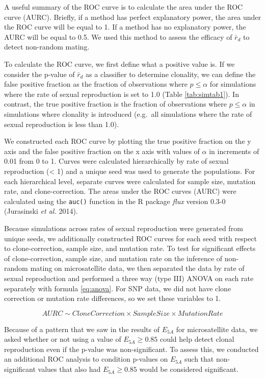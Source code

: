 \documentclass[]{article}
\theoremstyle{definition}
\theoremstyle{definition}
\theoremstyle{remark}
\begin{document}
A useful summary of the ROC curve is to calculate the area under the ROC
curve (AURC). Briefly, if a method has perfect explanatory power, the
area under the ROC curve will be equal to 1. If a method has no
explanatory power, the AURC will be equal to 0.5. We used this method to
assess the efficacy of \(\bar{r}_d\) to detect non-random mating.

To calculate the ROC curve, we first define what a positive value is. If
we consider the p-value of \(\bar{r}_d\) as a classifier to determine
clonality, we can define the false positive fraction as the fraction of
observations where \(p \leq \alpha\) for simulations where the rate of
sexual reproduction is set to 1.0 (Table \ref{tab:simtab1}). In
contrast, the true positive fraction is the fraction of observations
where \(p \leq \alpha\) in simulations where clonality is introduced
(e.g.~all simulations where the rate of sexual reproduction is less than
1.0).

We constructed each ROC curve by plotting the true positive fraction on
the y axis and the false positive fraction on the x axis with values of
\(\alpha\) in increments of 0.01 from 0 to 1. Curves were calculated
hierarchically by rate of sexual reproduction (\textless{} 1) and a
unique seed was used to generate the populations. For each hierarchical
level, separate curves were calculated for sample size, mutation rate,
and clone-correction. The areas under the ROC curves (AURC) were
calculated using the \texttt{auc()} function in the R package
\emph{flux} version 0.3-0 (Jurasinski \emph{et al.} 2014).

Because simulations across rates of sexual reproduction were generated
from unique seeds, we additionally constructed ROC curves for each seed
with respect to clone-correction, sample size, and mutation rate. To
test for significant effects of clone-correction, sample size, and
mutation rate on the inference of non-random mating on microsatellite
data, we then separated the data by rate of sexual reproduction and
performed a three way (type III) ANOVA on each rate separately with
formula \eqref{eq:anova}. For SNP data, we did not have clone correction
or mutation rate differences, so we set these variables to 1.

\begin{equation}
AURC \sim Clone Correction \times Sample Size \times Mutation Rate \label{eq:anova}
\end{equation}

Because of a pattern that we saw in the results of \(E_{5A}\) for
microsatellite data, we asked whether or not using a value of
\(E_{5A} \geq 0.85\) could help detect clonal reproduction even if the
p-value was non-significant. To assess this, we conducted an additional
ROC analysis to condition p-values on \(E_{5A}\) such that
non-significant values that also had \(E_{5A} \geq 0.85\) would be
considered significant.
\end{document}
